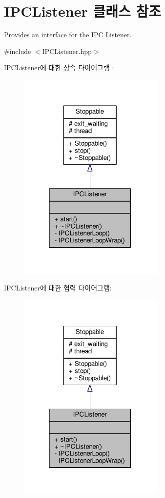\hypertarget{class_i_p_c_listener}{}\section{I\+P\+C\+Listener 클래스 참조}
\label{class_i_p_c_listener}


Provides an interface for the I\+PC Listener.  




{\ttfamily \#include $<$I\+P\+C\+Listener.\+hpp$>$}



I\+P\+C\+Listener에 대한 상속 다이어그램 \+: 
\nopagebreak
\begin{figure}[H]
\begin{center}
\leavevmode
\includegraphics[width=205pt]{class_i_p_c_listener__inherit__graph}
\end{center}
\end{figure}


I\+P\+C\+Listener에 대한 협력 다이어그램\+:
\nopagebreak
\begin{figure}[H]
\begin{center}
\leavevmode
\includegraphics[width=205pt]{class_i_p_c_listener__coll__graph}
\end{center}
\end{figure}
